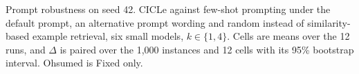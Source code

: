 \begin{table}[t]
  \centering
  \small
  \setlength{\tabcolsep}{4pt}
  \resizebox{\textwidth}{!}{}
  \caption{Prompt robustness on seed 42. CICLe against few-shot prompting under the default prompt, an alternative prompt wording and random instead of similarity-based example retrieval, six small models, $k \in \{1, 4\}$. Cells are means over the 12 runs, and $\Delta$ is paired over the 1,000 instances and 12 cells with its 95\% bootstrap interval. Ohsumed is Fixed only.}
  \label{tab:robust}
\end{table}
